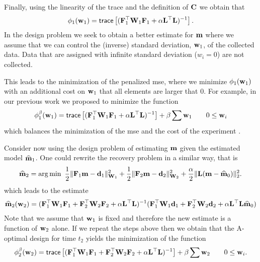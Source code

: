 \documentclass[leqno,onefignum,onetabnum]{siamltexmm}
\newcommand{\bfC}	{{\bf{C}}}
\newcommand{\bfF}	{{\bf{F}}}
\newcommand{\bfL}	{{\bf{L}}}
\newcommand{\bfW}	{{\bf{W}}}
\newcommand{\bfd}	{{\bf{d}}}
\newcommand{\bfm}	{{\bf{m}}}
\newcommand{\bfw}	{{\bf{w}}}
\newcommand{\hf}        {{\frac 12}}
\renewcommand{\hf}		 {\frac12}
\newcommand{\bfmhat}    {{\widehat{\bfm}}}
\newcommand{\LtL}       { \bfL^{\top}\bfL}
\begin{document}
Finally, using the linearity of the trace and the definition of $\bfC$ we obtain that
\begin{align}
\label{design1}
\phi_{1}(\bfw_1 ) =  {\sf trace} \left[   (\bfF_{1}^{\top}\bfW_{1}\bfF_{1}   + 
 {\alpha} \LtL)^{-1} \right]. 
\end{align}
In the design problem we seek to obtain a better estimate for $\bfm$ where we assume
that we can control the (inverse) standard deviation, $\bfw_{1}$, of the collected data.
Data that are assigned with infinite standard deviation ($w_i = 0$) are not collected.
 
 This leads to the minimization of the penalized mse, where 
we minimize $\phi_{1}(\bfw_{1})$ with an additional cost on $\bfw_{1}$ that all elements are larger that $0$.
 For example, in our
previous work we proposed to minimize the function
\begin{align}
\label{designp1}
\phi_{1}^{\beta}(\bfw_1 ) =  {\sf trace} \left[   (\bfF_{1}^{\top}\bfW_{1}\bfF_{1}   + 
 {\alpha} \LtL)^{-1} \right]  + \beta \sum \bfw_{1} \quad \quad 0 \le \bfw_i 
\end{align}
which balances the minimization of the mse and the cost of the experiment \cite{Haber2008}.

Consider now using the design problem of estimating $\bfm$ given the estimated model $\widehat \bfm_{1}$.
One could rewrite the recovery problem in a similar way,
that is
\begin{align}
\bfmhat_{2} = {\rm arg}\min\ \hf \| \bfF_{1} \bfm - \bfd_{1}\|^{2}_{\bfW_{1}} + \hf \| \bfF_{2} \bfm - \bfd_{2}\|^{2}_{\bfW_{2}}  + {\frac {\alpha} 2}
\|\bfL (\bfm -\bfmhat_{0}) \|^{2}_2. 
\end{align}
which leads to the estimate
\begin{align}
\label{mest2}
\bfmhat_{2}(\bfw_{2}) = (\bfF_{1}^{\top} \bfW_{1}\bfF_{1} +
\bfF_{2}^{\top} \bfW_{2}\bfF_{2} + \alpha \LtL)^{-1} (\bfF_{1}^{\top} \bfW_{1} \bfd_{1} +\bfF_{2}^{\top} \bfW_{2} \bfd_{2}
+ \alpha \LtL \bfmhat_{0})
\end{align}
Note that we assume that $\bfw_{1}$ is fixed and therefore the new estimate is a function of $\bfw_{2}$ alone.
If we repeat the steps above then we obtain that the A-optimal design for time $t_{2}$ yields the minimization of
the function
\begin{align}
\label{design2na}
\phi_{2}^{\beta}(\bfw_{2} ) =  {\sf trace} \left[   (\bfF_{1}^{\top}\bfW_{1}\bfF_{1}   + \bfF_{2}^{\top}\bfW_{2}\bfF_{2} +
\alpha \LtL)^{-1} \right] + \beta \sum \bfw_{2}\quad \quad 0 \le \bfw_i . 
\end{align}
\end{document}

